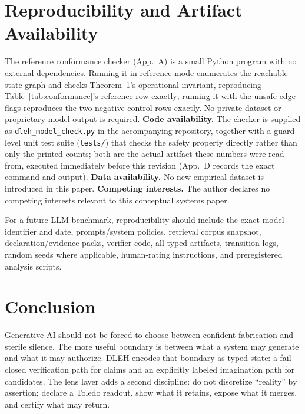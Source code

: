 \documentclass[10pt,twocolumn]{article}
\begin{document}
\section{Reproducibility and Artifact Availability}
The reference conformance checker (App.~A) is a small Python program with no external dependencies. Running it in reference mode enumerates the reachable state graph and checks Theorem~1's operational invariant, reproducing Table~\ref{tab:conformance}'s reference row exactly; running it with the unsafe-edge flags reproduces the two negative-control rows exactly. No private dataset or proprietary model output is required. \textbf{Code availability.} The checker is supplied as \texttt{dleh\_model\_check.py} in the accompanying repository, together with a guard-level unit test suite (\texttt{tests/}) that checks the safety property directly rather than only the printed counts; both are the actual artifact these numbers were read from, executed immediately before this revision (App.~D records the exact command and output). \textbf{Data availability.} No new empirical dataset is introduced in this paper. \textbf{Competing interests.} The author declares no competing interests relevant to this conceptual systems paper.

For a future LLM benchmark, reproducibility should include the exact model identifier and date, prompts/system policies, retrieval corpus snapshot, declaration/evidence packs, verifier code, all typed artifacts, transition logs, random seeds where applicable, human-rating instructions, and preregistered analysis scripts.

\section{Conclusion}
Generative AI should not be forced to choose between confident fabrication and sterile silence. The more useful boundary is between what a system may generate and what it may authorize. DLEH encodes that boundary as typed state: a fail-closed verification path for claims and an explicitly labeled imagination path for candidates. The lens layer adds a second discipline: do not discretize ``reality'' by assertion; declare a Toledo readout, show what it retains, expose what it merges, and certify what may return.

\begin{center}
\end{center}
\end{document}
